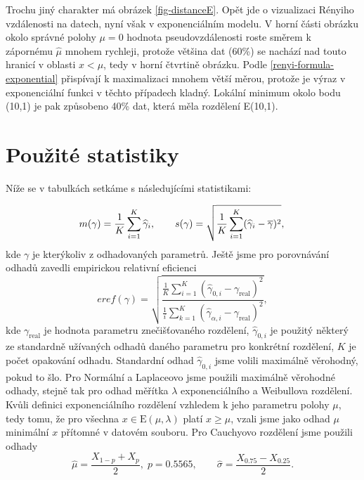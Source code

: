 Trochu jiný charakter má obrázek \ref{fig-distanceE}. Opět jde o vizualizaci Rényiho vzdálenosti na datech, nyní však v exponenciálním modelu. V horní části obrázku okolo správné polohy $\mu = 0$  hodnota pseudovzdálenosti roste směrem k zápornému $\hat{\mu}$ mnohem rychleji, protože většina dat (60\%) se nachází nad touto hranicí v oblasti $x<\mu$, tedy v horní čtvrtině obrázku. Podle \eqref{renyi-formula-exponential} přispívají k maximalizaci mnohem větší měrou, protože je výraz v exponenciální funkci v těchto případech kladný. Lokální minimum okolo bodu (10,1) je pak způsobeno 40\% dat, která měla rozdělení E(10,1).


\section{Použité statistiky}


 Níže se v tabulkách setkáme s následujícími statistikami:

\begin{equation}
	m(\gamma) = \frac{1}{K}\sum_{i=1}^K \widehat{\gamma}_{i}, \qquad s(\gamma) = \sqrt{\frac{1}{K}\sum_{i=1}^K (\widehat{\gamma}_{i}-\overline{\gamma})^2},\\
	\label{stat1}
\end{equation}
kde $\gamma $ je kterýkoliv z odhadovaných parametrů. Ještě jsme pro porovnávání odhadů zavedli empirickou relativní eficienci 
\begin{equation}
	eref(\gamma) = \sqrt{\dfrac{\frac{1}{K}\sum_{i=1}^K (\widehat{\gamma}_{\mathrm{0} ,i} - \gamma_{\mathrm{real}})^2}{\frac{1}{i}\sum_{k=1}^K (\widehat{\gamma}_{\alpha,i} - \gamma_{\mathrm{real}})^2}},
	\label{stat2}
\end{equation}
kde $\gamma_\mathrm{real}$ je hodnota parametru znečišťovaného rozdělení, $\widehat{\gamma}_{0,i}$ je použitý některý ze standardně užívaných odhadů daného parametru pro konkrétní rozdělení, $K$ je počet opakování odhadu. Standardní odhad $\widehat{\gamma}_{0,i}$ jsme volili maximálně věrohodný, pokud to šlo. Pro Normální a Laplaceovo jsme použili maximálně věrohodné odhady, stejně tak pro odhad měřítka $\lambda$ exponenciálního a Weibullova rozdělení. Kvůli definici exponenciálního rozdělení vzhledem k jeho parametru polohy $\mu$, tedy tomu, že pro všechna $x \in \mathrm{E}(\mu,\lambda)$ platí $x \geq \mu$, vzali jsme jako odhad $\mu$ minimální $x$ přítomné v datovém souboru.
Pro Cauchyovo rozdělení jsme použili odhady
\begin{equation}
	\widehat{\mu}  = \frac{X_{1-p} + X_{p}}{2}, \; p = 0.5565, \qquad \widehat{\sigma}  = \frac{X_{0.75} - X_{0.25}}{2}.
\end{equation}


